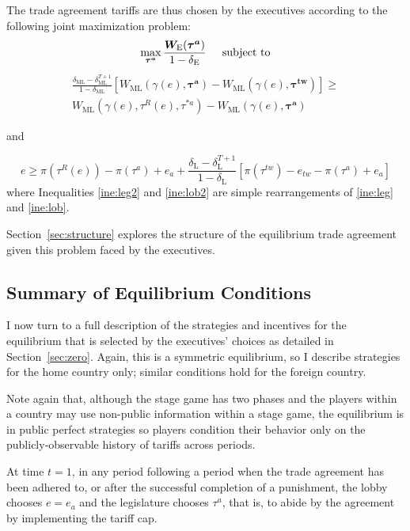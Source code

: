 \documentclass[authoryear, review]{elsarticle}
\newcommand{\bta}{\bm{\tau^a}}
\newcommand{\ga}{\gamma}
\newcommand{\btw}{\bm{\tau^{tw}}}
\newcommand{\de}{\delta}
\begin{document}
The trade agreement tariffs are thus chosen by the executives according to the following joint maximization problem:
\begin{equation}
  \max_{\bta} \frac{\bm{W_\text{E}}(\bta)}{1-\de_\text{E}} \hskip.2in \text{subject to}
  \label{prob:max}
\end{equation}
\begin{multline}
  \frac{\de_\text{ML} - \de_\text{ML}^{T+1}}{1-\de_\text{ML}} \left[W_\text{ML}(\ga(e),\bta) - W_{\text{ML}}(\ga(e),\btw) \right] \geq \\
	W_{\text{ML}}(\ga(e),\tau^R(e),\tau^{*a}) - W_{\text{ML}}(\ga(e),\bta)
  \label{ine:leg2}
\end{multline}
\begin{center}
and
\end{center}
\begin{equation}
  e \geq \pi(\tau^R(e)) - \pi(\tau^a) + e_a + \frac{\de_\text{L} - \de_\text{L}^{T+1}}{1-\de_\text{L}} \left[\pi(\tau^{tw}) -e_{tw} - \pi(\tau^a) + e_a\right]
  \label{ine:lob2}
\end{equation}
where Inequalities \ref{ine:leg2} and \ref{ine:lob2} are simple rearrangements of \ref{ine:leg} and \ref{ine:lob}.

Section~\ref{sec:structure} explores the structure of the equilibrium trade agreement given this problem faced by the executives.

\subsection{Summary of Equilibrium Conditions}
\label{sec:nashrev}
I now turn to a full description of the strategies and incentives for the equilibrium that is selected by the executives' choices as detailed in Section~\ref{sec:zero}. Again, this is a symmetric equilibrium, so I describe strategies for the home country only; similar conditions hold for the foreign country.

Note again that, although the stage game has two phases and the players within a country may use non-public information within a stage game, the equilibrium is in public perfect strategies so players condition their behavior only on the publicly-observable history of tariffs across periods.

At time $t=1$, in any period following a period when the trade agreement has been adhered to, or after the successful completion of a punishment, the lobby chooses $e =e_a$ and the legislature chooses $\tau^a$, that is, to abide by the agreement by implementing the tariff cap.
\end{document}
